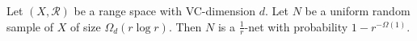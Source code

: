 \begin{lemma}[label=thm:enet-general]
	Let \((X, \mathcal{R})\) be a range space with VC-dimension \(d\).
	Let \(N\) be a uniform random sample of \(X\) of size
	\(\Omega_d(r \log r)\).
	Then \(N\) is a \(\frac 1r\)-net with probability \(1-r^{-\Omega(1)}\).
\end{lemma}
